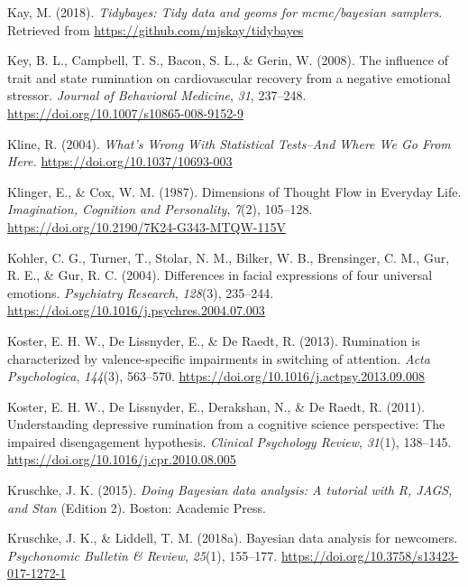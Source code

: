 \documentclass[a4paper,12pt,twoside,openright,oldfontcommands]{memoir}
\begin{document}
\leavevmode\hypertarget{ref-R-tidybayes}{}%
Kay, M. (2018). \emph{Tidybayes: Tidy data and geoms for mcmc/bayesian samplers}. Retrieved from \url{https://github.com/mjskay/tidybayes}

\leavevmode\hypertarget{ref-Key2008}{}%
Key, B. L., Campbell, T. S., Bacon, S. L., \& Gerin, W. (2008). The influence of trait and state rumination on cardiovascular recovery from a negative emotional stressor. \emph{Journal of Behavioral Medicine}, \emph{31}, 237--248. \url{https://doi.org/10.1007/s10865-008-9152-9}

\leavevmode\hypertarget{ref-Kline2004}{}%
Kline, R. (2004). \emph{What's Wrong With Statistical Tests--And Where We Go From Here.} \url{https://doi.org/10.1037/10693-003}

\leavevmode\hypertarget{ref-klinger_dimensions_1987}{}%
Klinger, E., \& Cox, W. M. (1987). Dimensions of Thought Flow in Everyday Life. \emph{Imagination, Cognition and Personality}, \emph{7}(2), 105--128. \url{https://doi.org/10.2190/7K24-G343-MTQW-115V}

\leavevmode\hypertarget{ref-kohler_differences_2004}{}%
Kohler, C. G., Turner, T., Stolar, N. M., Bilker, W. B., Brensinger, C. M., Gur, R. E., \& Gur, R. C. (2004). Differences in facial expressions of four universal emotions. \emph{Psychiatry Research}, \emph{128}(3), 235--244. \url{https://doi.org/10.1016/j.psychres.2004.07.003}

\leavevmode\hypertarget{ref-Koster2013}{}%
Koster, E. H. W., De Lissnyder, E., \& De Raedt, R. (2013). Rumination is characterized by valence-specific impairments in switching of attention. \emph{Acta Psychologica}, \emph{144}(3), 563--570. \url{https://doi.org/10.1016/j.actpsy.2013.09.008}

\leavevmode\hypertarget{ref-Koster2011}{}%
Koster, E. H. W., De Lissnyder, E., Derakshan, N., \& De Raedt, R. (2011). Understanding depressive rumination from a cognitive science perspective: The impaired disengagement hypothesis. \emph{Clinical Psychology Review}, \emph{31}(1), 138--145. \url{https://doi.org/10.1016/j.cpr.2010.08.005}

\leavevmode\hypertarget{ref-kruschke_doing_2015}{}%
Kruschke, J. K. (2015). \emph{Doing Bayesian data analysis: A tutorial with R, JAGS, and Stan} (Edition 2). Boston: Academic Press.

\leavevmode\hypertarget{ref-kruschke_bayesian_2018}{}%
Kruschke, J. K., \& Liddell, T. M. (2018a). Bayesian data analysis for newcomers. \emph{Psychonomic Bulletin \& Review}, \emph{25}(1), 155--177. \url{https://doi.org/10.3758/s13423-017-1272-1}
\end{document}
